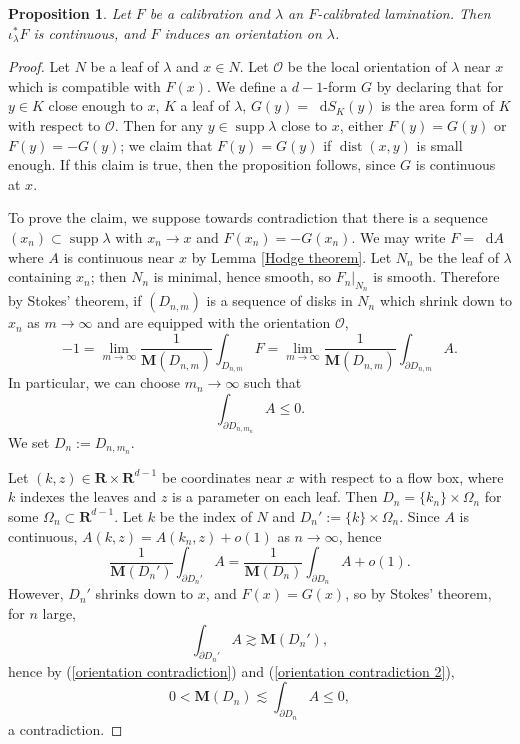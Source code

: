 \documentclass[reqno,11pt]{amsart}
\newcommand{\RR}{\mathbf{R}}
\newcommand*\dif{\mathop{}\!\mathrm{d}}
\DeclareMathOperator{\dist}{dist}
\DeclareMathOperator{\supp}{supp}
\newcommand{\Mass}{\mathbf M}
\newtheorem{proposition}[theorem]{Proposition}
\theoremstyle{definition}
\numberwithin{equation}{section}
\begin{document}
\begin{proposition}\label{calibrated implies oriented}
Let $F$ be a calibration and $\lambda$ an $F$-calibrated lamination.
Then $\iota_\lambda^* F$ is continuous, and $F$ induces an orientation on $\lambda$.
\end{proposition}
\begin{proof}
Let $N$ be a leaf of $\lambda$ and $x \in N$.
Let $\mathscr O$ be the local orientation of $\lambda$ near $x$ which is compatible with $F(x)$. 
We define a $d - 1$-form $G$ by declaring that for $y \in K$ close enough to $x$, $K$ a leaf of $\lambda$, $G(y) = \dif S_K(y)$ is the area form of $K$ with respect to $\mathscr O$.
Then for any $y \in \supp \lambda$ close to $x$, either $F(y) = G(y)$ or $F(y) = -G(y)$; we claim that $F(y) = G(y)$ if $\dist(x, y)$ is small enough.
If this claim is true, then the proposition follows, since $G$ is continuous at $x$.

To prove the claim, we suppose towards contradiction that there is a sequence $(x_n) \subset \supp \lambda$ with $x_n \to x$ and $F(x_n) = -G(x_n)$.
We may write $F = \dif A$ where $A$ is continuous near $x$ by Lemma \ref{Hodge theorem}.
Let $N_n$ be the leaf of $\lambda$ containing $x_n$; then $N_n$ is minimal, hence smooth, so $F_n|_{N_n}$ is smooth.
Therefore by Stokes' theorem, if $(D_{n, m})$ is a sequence of disks in $N_n$ which shrink down to $x_n$ as $m \to \infty$ and are equipped with the orientation $\mathscr O$,
$$-1 = \lim_{m \to \infty} \frac{1}{\Mass(D_{n, m})} \int_{D_{n, m}} F = \lim_{m \to \infty} \frac{1}{\Mass(D_{n, m})} \int_{\partial D_{n, m}} A.$$
In particular, we can choose $m_n \to \infty$ such that 
\begin{equation}\label{orientation contradiction}
\int_{\partial D_{n, m_n}} A \leq 0.
\end{equation}
We set $D_n := D_{n, m_n}$.

Let $(k, z) \in \RR \times \RR^{d - 1}$ be coordinates near $x$ with respect to a flow box, where $k$ indexes the leaves and $z$ is a parameter on each leaf.
Then $D_n = \{k_n\} \times \Omega_n$ for some $\Omega_n \subset \RR^{d - 1}$.
Let $k$ be the index of $N$ and $D_n' := \{k\} \times \Omega_n$.
Since $A$ is continuous, $A(k, z) = A(k_n, z) + o(1)$ as $n \to \infty$, hence
\begin{equation}\label{orientation contradiction 2}
\frac{1}{\Mass(D_n')} \int_{\partial D_n'} A = \frac{1}{\Mass(D_n)} \int_{\partial D_n} A + o(1).
\end{equation}
However, $D_n'$ shrinks down to $x$, and $F(x) = G(x)$, so by Stokes' theorem, for $n$ large,
$$\int_{\partial D_n'} A \gtrsim \Mass(D_n'),$$
hence by (\ref{orientation contradiction}) and (\ref{orientation contradiction 2}),
$$0 < \Mass(D_n) \lesssim \int_{\partial D_n} A \leq 0,$$
a contradiction.
\end{proof}
\end{document}
